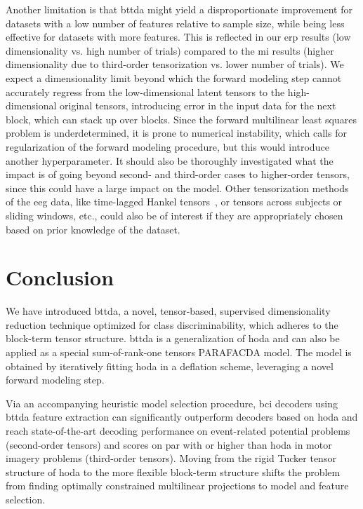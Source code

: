 Another limitation is that \ac{bttda} might yield a disproportionate
improvement for datasets with a low number of features relative to sample size,
while being less effective for datasets with more features.
This is reflected in our \ac{erp} results (low dimensionality vs. high number of
trials) compared to the \ac{mi} results (higher dimensionality due to third-order
tensorization vs. lower number of trials).
We expect a dimensionality limit beyond which the forward modeling step cannot
accurately regress from the low-dimensional latent tensors to the high-
dimensional original tensors, introducing
error in the input data for the next block, which can stack up over blocks.
Since the forward multilinear least squares problem is underdetermined, it is
prone to numerical instability, which calls for regularization of the forward
modeling procedure, but this would introduce another hyperparameter.
It should also be thoroughly investigated what the impact is of going beyond
second- and third-order cases to higher-order tensors, since this could have a
large impact on the model.
Other tensorization methods of the \ac{eeg} data, like time-lagged Hankel
tensors~\cite{Papy2005}, or tensors across subjects or sliding windows, etc.,
could also be of interest if they are appropriately chosen based on prior
knowledge of the dataset.

\section{Conclusion}

We have introduced \acf{bttda}, a novel,
tensor-based, supervised dimensionality reduction technique optimized for class
discriminability, which adheres to the block-term tensor structure.
\ac{bttda} is a generalization of \acf{hoda} and can also be
applied as a special sum-of-rank-one tensors PARAFACDA model.
The model is obtained by iteratively fitting \ac{hoda} in a deflation scheme,
leveraging a novel forward modeling step.

Via an accompanying heuristic model selection procedure, \ac{bci} decoders using
\ac{bttda} feature extraction can significantly outperform decoders based on
\ac{hoda} and reach state-of-the-art decoding performance on event-related potential
problems (second-order tensors) and scores on par with or higher than \ac{hoda} in motor
imagery problems (third-order tensors).
Moving from the rigid Tucker tensor structure of \ac{hoda} to the more flexible
block-term structure shifts the problem from finding optimally constrained
multilinear projections to model and feature selection.

